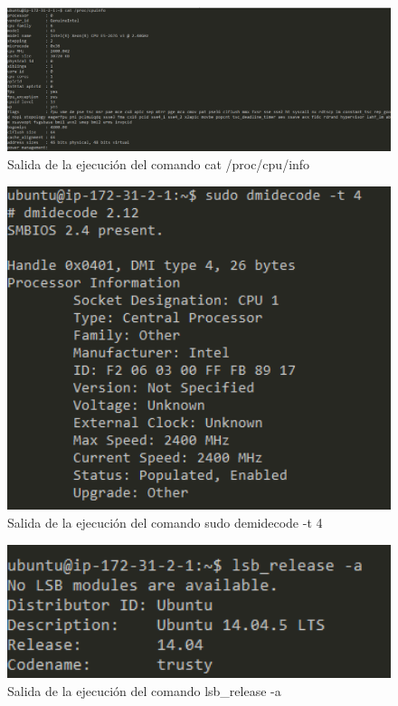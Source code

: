 \begin{figure}[H]
   \centering
   \includegraphics[width=12cm]{img/cpuinfo}
   \caption{Salida de la ejecución del comando cat /proc/cpu/info }
   \label{figura:cpuinfo}
\end{figure}
\begin{figure}[H]
   \centering
   \includegraphics[width=12cm]{img/dmidecode}
   \caption{Salida de la ejecución del comando sudo demidecode -t 4}
   \label{figura:dmidecode}
\end{figure}
\begin{figure}[H]
   \centering
   \includegraphics[width=12cm]{img/lsb_release}
   \caption{Salida de la ejecución del comando lsb\_release -a}
   \label{figura:lsb_release}
\end{figure}
